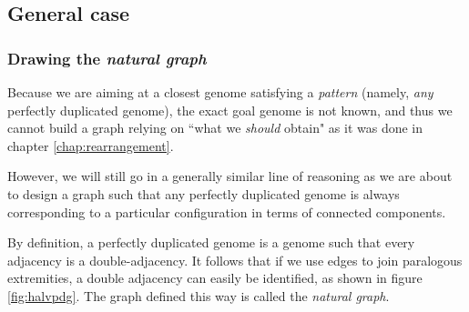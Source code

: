 \documentclass[11pt,final,twoside,nofrench]{thlifl}
\begin{document}
\subsection{General case}

\subsubsection{Drawing the \emph{natural graph}}

Because we are aiming at a closest genome satisfying a \emph{pattern} (namely, \emph{any} perfectly duplicated genome), the exact goal genome is not known, and thus we cannot build a graph relying on ``what we \emph{should} obtain" as it was done in chapter \ref{chap:rearrangement}.

However, we will still go in a generally similar line of reasoning as we are about to design a graph such that any perfectly duplicated genome is always corresponding to a particular configuration in terms of connected components.

By definition, a perfectly duplicated genome is a genome such that every adjacency is a double-adjacency. It follows that if we use edges to join paralogous extremities, a double adjacency can easily be identified, as shown in figure \ref{fig:halvpdg}. The graph defined this way is called the \emph{natural graph}.
\end{document}
